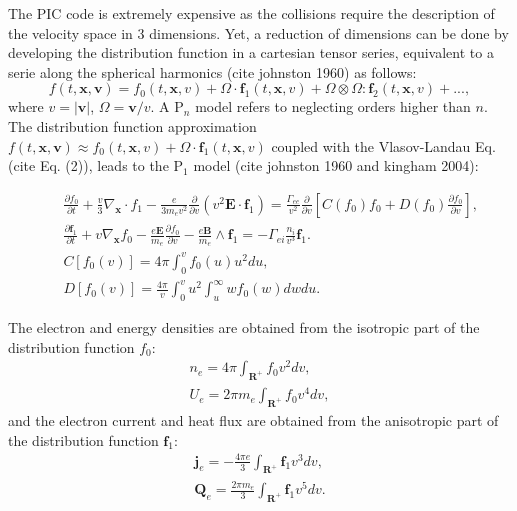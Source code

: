 The PIC code is extremely expensive as the collisions require the description of the velocity space in 3 dimensions. Yet, a reduction of dimensions can be done by developing the distribution function in a cartesian tensor series, equivalent to a serie along the spherical harmonics (cite johnston 1960) as follows:
\begin{equation}
f(t,\mathbf{x},\mathbf{v})=f_0(t,\mathbf{x},v)+\Omega\cdot \mathbf{f}_1(t,\mathbf{x},v)+\Omega\otimes\Omega:\mathbf{f}_2(t,\mathbf{x},v)+... \label{Pn},
\end{equation}
where $v=|\mathbf{v}|$, $\Omega=\mathbf{v}/v$. A P$_n$ model refers to neglecting orders higher than $n$.
The distribution function approximation $f(t,\mathbf{x},\mathbf{v})\approx f_0(t,\mathbf{x},v)+\Omega\cdot \mathbf{f}_1(t,\mathbf{x},v)$ coupled with the Vlasov-Landau Eq. (cite Eq. (2)), leads to the P$_1$ model (cite johnston 1960 and kingham 2004):
\begin{widetext}
\begin{eqnarray}
&&\frac{\partial f_0}{\partial t}+\frac{v}{3}\nabla_{\mathbf{x}}\cdot f_1-\frac{e}{3m_ev^2}\frac{\partial}{\partial v}(v^2\mathbf{E}\cdot \mathbf{f}_1)=\frac{\Gamma_{ee}}{v^2}\frac{\partial}{\partial v}\left[C(f_0)f_0+D(f_0)\frac{\partial f_0}{\partial v}\right],\\
&&\frac{\partial \mathbf{f}_1}{\partial t}+v\nabla_{\mathbf{x}}f_0-\frac{e\mathbf{E}}{m_e}\frac{\partial f_0}{\partial v}-\frac{e\mathbf{B}}{m_e}\wedge \mathbf{f}_1=-\Gamma_{ei}\frac{n_i}{v^3}\mathbf{f}_1.\\ 
&&C[f_0(v)]=4\pi\int_0^vf_0(u)u^2du,\\
&&D[f_0(v)]=\frac{4\pi}{v}\int_0^vu^2\int_u^\infty wf_0(w)dwdu.\label{P1}
\end{eqnarray}
\end{widetext}



The electron and energy densities are obtained from the isotropic part of the distribution function $f_0$:
\begin{eqnarray}
n_e=4\pi\int_{\mathbf{R}^+} f_0v^2dv,\\
U_e=2\pi m_e\int_{\mathbf{R}^+} f_0v^4dv,
\end{eqnarray}
and the electron current and heat flux are obtained from the anisotropic part of the distribution function $\mathbf{f}_1$:
\begin{eqnarray}
\mathbf{j}_e=-\frac{4\pi e}{3}\int_{\mathbf{R}^+} \mathbf{f}_1v^3dv,\\
\mathbf{Q}_e=\frac{2\pi m_e}{3}\int_{\mathbf{R}^+} \mathbf{f}_1v^5dv.
\end{eqnarray}

